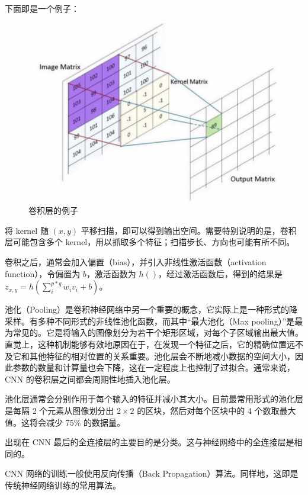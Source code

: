 下面即是一个例子：

\begin{figure}[ht]
    \centering
    \includegraphics[width=\linewidth]{figures/cnn_conv}
    \caption{卷积层的例子}
    \label{fig:cnn_conv}
\end{figure}

将 kernel 随 ${\displaystyle (x,y)}$ 平移扫描，即可以得到输出空间。需要特别说明的是，卷积层可能包含多个 kernel，用以抓取多个特征；扫描步长、方向也可能有所不同。

卷积之后，通常会加入偏置（bias），并引入非线性激活函数（activation function），令偏置为 ${\displaystyle b}$，激活函数为 ${\displaystyle h\left(\right)}$，经过激活函数后，得到的结果是 ${\displaystyle z_{x,y}=h\left(\sum_i^{p*q} w_i v_i +b\right)}$。

池化（Pooling）是卷积神经网络中另一个重要的概念，它实际上是一种形式的降采样。有多种不同形式的非线性池化函数，而其中“最大池化（Max pooling）”是最为常见的。它是将输入的图像划分为若干个矩形区域，对每个子区域输出最大值。直觉上，这种机制能够有效地原因在于，在发现一个特征之后，它的精确位置远不及它和其他特征的相对位置的关系重要。池化层会不断地减小数据的空间大小，因此参数的数量和计算量也会下降，这在一定程度上也控制了过拟合。通常来说，CNN 的卷积层之间都会周期性地插入池化层。

池化层通常会分别作用于每个输入的特征并减小其大小。目前最常用形式的池化层是每隔 2 个元素从图像划分出 ${\displaystyle 2\times 2}$ 的区块，然后对每个区块中的 4 个数取最大值。这将会减少 75\% 的数据量。

出现在 CNN 最后的全连接层的主要目的是分类。这与神经网络中的全连接层是相同的。

CNN 网络的训练一般使用反向传播（Back Propagation）算法。同样地，这即是传统神经网络训练的常用算法。
\fi


